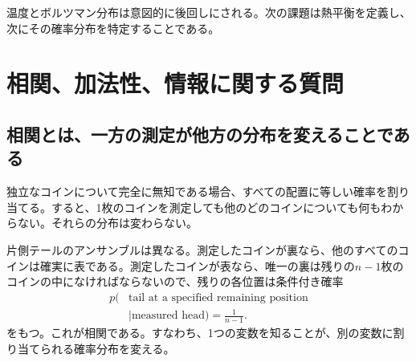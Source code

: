 \begin{classroomqa}
\end{classroomqa}

温度とボルツマン分布は意図的に後回しにされる。次の課題は熱平衡を定義し、次にその確率分布を特定することである。

\section{相関、加法性、情報に関する質問}

\subsection{相関とは、一方の測定が他方の分布を変えることである}

独立なコインについて完全に無知である場合、すべての配置に等しい確率を割り当てる。すると、1枚のコインを測定しても他のどのコインについても何もわからない。それらの分布は変わらない。

片側テールのアンサンブルは異なる。測定したコインが裏なら、他のすべてのコインは確実に表である。測定したコインが表なら、唯一の裏は残りの\(n-1\)枚のコインの中になければならないので、残りの各位置は条件付き確率
\begin{equation}
\begin{aligned}
 p(&\text{tail at a specified remaining position}\\
   &\mid\text{measured head})=\frac{1}{n-1}.
\end{aligned}
 \label{eq:sm1-conditional-tail}
\end{equation}
をもつ。これが相関である。すなわち、1つの変数を知ることが、別の変数に割り当てられる確率分布を変える。

\begin{classroomqa}
\end{classroomqa}

